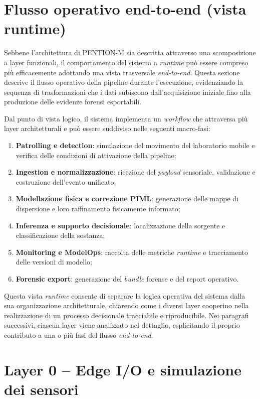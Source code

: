 \section{Flusso operativo end-to-end (vista runtime)}
\label{sec:runtime_flow}

Sebbene l’architettura di \textsc{PENTION-M} sia descritta attraverso una scomposizione a layer funzionali, il comportamento del sistema a \textit{runtime} può essere compreso più efficacemente adottando una vista trasversale \emph{end-to-end}.
Questa sezione descrive il flusso operativo della pipeline durante l’esecuzione, evidenziando la sequenza di trasformazioni che i dati subiscono dall’acquisizione iniziale fino alla produzione delle evidenze forensi esportabili.

Dal punto di vista logico, il sistema implementa un \textit{workflow} che attraversa più layer architetturali e può essere suddiviso nelle seguenti macro-fasi:

\begin{enumerate}
	\item \textbf{Patrolling e detection}: simulazione del movimento del laboratorio mobile e verifica delle condizioni di attivazione della pipeline;
	\item \textbf{Ingestion e normalizzazione}: ricezione del \textit{payload} sensoriale, validazione e costruzione dell’evento unificato;
	\item \textbf{Modellazione fisica e correzione PIML}: generazione delle mappe di dispersione e loro raffinamento fisicamente informato;
	\item \textbf{Inferenza e supporto decisionale}: localizzazione della sorgente e classificazione della sostanza;
	\item \textbf{Monitoring e ModelOps}: raccolta delle metriche \textit{runtime} e tracciamento delle versioni di modello;
	\item \textbf{Forensic export}: generazione del \textit{bundle} forense e del report operativo.
\end{enumerate}

Questa vista \textit{runtime} consente di separare la logica operativa del sistema dalla sua organizzazione architetturale, chiarendo come i diversi layer cooperino nella realizzazione di un processo decisionale tracciabile e riproducibile.
Nei paragrafi successivi, ciascun layer viene analizzato nel dettaglio, esplicitando il proprio contributo a una o più fasi del flusso \textit{end-to-end}.

\section{Layer 0 – Edge I/O e simulazione dei sensori}


